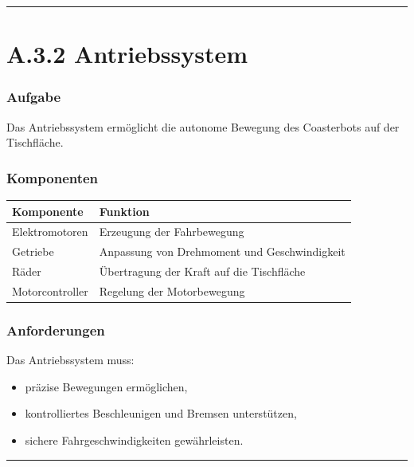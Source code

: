 \documentclass[
]{article}
\providecommand{\tightlist}{%
  \setlength{\itemsep}{0pt}\setlength{\parskip}{0pt}}
\begin{document}
\begin{center}\rule{0.5\linewidth}{0.5pt}\end{center}

\section{A.3.2 Antriebssystem}\label{a.3.2-antriebssystem}

\subsubsection{Aufgabe}\label{aufgabe-1}

Das Antriebssystem ermöglicht die autonome Bewegung des Coasterbots auf
der Tischfläche.

\subsubsection{Komponenten}\label{komponenten}

\begin{longtable}[]{@{}ll@{}}
\toprule\noalign{}
Komponente & Funktion \\
\midrule\noalign{}
\endhead
\bottomrule\noalign{}
\endlastfoot
Elektromotoren & Erzeugung der Fahrbewegung \\
Getriebe & Anpassung von Drehmoment und Geschwindigkeit \\
Räder & Übertragung der Kraft auf die Tischfläche \\
Motorcontroller & Regelung der Motorbewegung \\
\end{longtable}

\subsubsection{Anforderungen}\label{anforderungen-1}

Das Antriebssystem muss:

\begin{itemize}
\tightlist
\item
  präzise Bewegungen ermöglichen,
\item
  kontrolliertes Beschleunigen und Bremsen unterstützen,
\item
  sichere Fahrgeschwindigkeiten gewährleisten.
\end{itemize}

\begin{center}\rule{0.5\linewidth}{0.5pt}\end{center}
\end{document}
